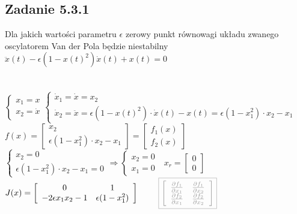 \subsection*{Zadanie 5.3.1} {\color{darkgray}
	Dla jakich wartości parametru $\epsilon$ zerowy punkt równowagi układu zwanego oscylatorem Van der Pola będzie niestabilny\\
	$\ddot{x}(t)-\epsilon(1-x(t)^2)\dot{x}(t)+x(t)=0$\\
}\\\\
$\begin{cases} x_1=x \\ x_2 =\dot{x} \end{cases} \begin{cases} \dot{x}_1=\dot{x}=x_2 \\ \dot{x}_2=\ddot{x}= \epsilon(1-x(t)^2) \cdot \dot{x}(t)-x(t)=\epsilon(1-x_1^2) \cdot x_2 - x_1 \end{cases}$\\
$f(x)=\left[ \begin{array}{c}   x_2  \\  \epsilon(1-x_1^2) \cdot x_2 - x_1  \end{array}\right] = \left[ \begin{array}{c}  f_1(x)   \\ f_2(x)   \end{array}\right]$\\
$\begin{cases} x_2=0 \\ \epsilon(1-x_1^2) \cdot x_2 - x_1 = 0\end {cases} \Rightarrow \begin{cases}x_2=0 \\ x_1 = 0 \end {cases} \ \ \ x_r = \left[ \begin{array}{c}     0\\0   \end{array}\right]$\\
$J(x)=\left[ \begin{array}{cc}   0 &1  \\ -2\epsilon x_1 x_2 -1 & \epsilon(1-x_1^2)   \end{array}\right] \ \ \ \ \ \ \ 
{\color{lightgray}\boxed{\left[ \begin{array}{cc}    \frac{\partial f_1}{\partial x_1} &\frac{\partial f_1}{\partial x_2} \\ \frac{\partial f_2}{\partial x_1} & \frac{\partial f_2}{\partial x_2}   \end{array}\right]}}$\\
